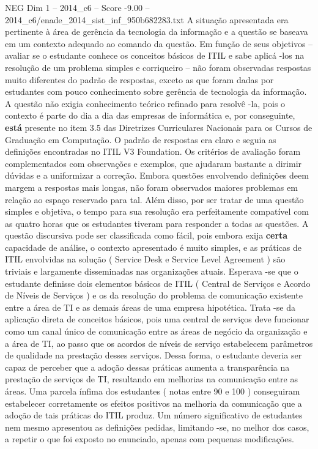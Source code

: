 \begin{textsample}{NEG Dim 1 – 2014\_c6 – Score -9.00 – 2014\_c6/enade\_2014\_sist\_inf\_950b682283.txt}
A situação apresentada era pertinente à área de gerência da tecnologia da informação e a questão se baseava em um contexto adequado ao comando da questão.
Em função de seus objetivos – avaliar se o estudante conhece os conceitos básicos de ITIL e sabe aplicá -los na resolução de um problema simples e corriqueiro – não foram observadas respostas muito diferentes do padrão de respostas, exceto as que foram dadas por estudantes com pouco conhecimento sobre gerência de tecnologia da informação.
A questão não exigia conhecimento teórico refinado para resolvê -la, pois o contexto é parte do dia a dia das empresas de informática e, por conseguinte, \textbf{está} presente no item 3.5 das Diretrizes Curriculares Nacionais para os Cursos de Graduação em Computação.
O padrão de respostas era claro e seguia as definições encontradas no ITIL V3 Foundation.
Os critérios de avaliação foram complementados com observações e exemplos, que ajudaram bastante a dirimir dúvidas e a uniformizar a correção.
Embora questões envolvendo definições deem margem a respostas mais longas, não foram observados maiores problemas em relação ao espaço reservado para tal.
Além disso, por ser tratar de uma questão simples e objetiva, o tempo para sua resolução era perfeitamente compatível com as quatro horas que os estudantes tiveram para responder a todas as questões.
A questão discursiva pode ser classificada como fácil, pois embora exija \textbf{certa} capacidade de análise, o contexto apresentado é muito simples, e as práticas de ITIL envolvidas na solução ( Service Desk e Service Level Agreement ) são triviais e largamente disseminadas nas organizações atuais.
Esperava -se que o estudante definisse dois elementos básicos de ITIL ( Central de Serviços e Acordo de Níveis de Serviços ) e os da resolução do problema de comunicação existente entre a área de TI e as demais áreas de uma empresa hipotética.
Trata -se da aplicação direta de conceitos básicos, pois uma central de serviços deve funcionar como um canal único de comunicação entre as áreas de negócio da organização e a área de TI, ao passo que os acordos de níveis de serviço estabelecem parâmetros de qualidade na prestação desses serviços.
Dessa forma, o estudante deveria ser capaz de perceber que a adoção dessas práticas aumenta a transparência na prestação de serviços de TI, resultando em melhorias na comunicação entre as áreas.
Uma parcela ínfima dos estudantes ( notas entre 90 e 100 ) conseguiram estabelecer corretamente os efeitos positivos na melhoria da comunicação que a adoção de tais práticas do ITIL produz.
Um número significativo de estudantes nem mesmo apresentou as definições pedidas, limitando -se, no melhor dos casos, a repetir o que foi exposto no enunciado, apenas com pequenas modificações.

\end{textsample}
